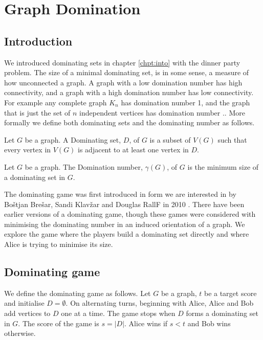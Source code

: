 \chapter{Graph Domination}\label{chpt:domSet}

\section{Introduction}

We introduced dominating sets in chapter \ref{chpt:into} with the dinner party problem. The size of a minimal dominating set, is in some sense, a measure of how unconnected a graph. A graph with a low domination number has high connectivity, and a graph with a high domination number has low connectivity. For example any complete graph $K_n$ has domination number 1, and the graph that is just the set of $n$ independent vertices has domination number $.$. More formally we define  both dominating sets and the dominating number as follows.

\begin{definition}
    Let $G$ be a graph. A Dominating set, $D$, of $G$ is a subset of $V(G)$ such that every vertex in $V(G)$ is adjacent to at least one vertex in $D$.
\end{definition} 
\begin{definition}
    Let $G$ be a graph. The Domination number, $\gamma(G)$, of $G$ is the minimum size of a dominating set in $G$.
\end{definition}

 The dominating game was first introduced in form we are interested in by Bo\v{s}tjan Bre\v{s}ar, Sandi Klav\v{z}ar and Douglas RallF in 2010 \cite{BrKlRa2010}. There have been earlier versions of a dominating game, though these games were considered with minimising the dominating number in an induced orientation of a graph. We explore the game where the players build a dominating set directly and where Alice is trying to minimise its size. 


\section{Dominating game}

We define the dominating game as follows. Let $G$ be a graph, $t$ be a target score and initialise $D=\emptyset$. On alternating turns, beginning with Alice, Alice and Bob add vertices to $D$ one at a time. The game stops when $D$ forms a dominating set in $G$. The score of the game is $s=|D|$. Alice wins if $s<t$ and Bob wins otherwise. %

